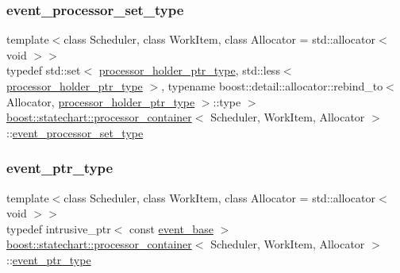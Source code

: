 \subsubsection{\texorpdfstring{event\+\_\+processor\+\_\+set\+\_\+type}{event\_processor\_set\_type}}
{\footnotesize\ttfamily template$<$class Scheduler, class Work\+Item, class Allocator = std\+::allocator$<$ void $>$$>$ \\
typedef std\+::set$<$ \mbox{\hyperlink{classboost_1_1statechart_1_1processor__container_a885e5a42694857bfaa44ec053ed20a57}{processor\+\_\+holder\+\_\+ptr\+\_\+type}}, std\+::less$<$ \mbox{\hyperlink{classboost_1_1statechart_1_1processor__container_a885e5a42694857bfaa44ec053ed20a57}{processor\+\_\+holder\+\_\+ptr\+\_\+type}} $>$, typename boost\+::detail\+::allocator\+::rebind\+\_\+to$<$ Allocator, \mbox{\hyperlink{classboost_1_1statechart_1_1processor__container_a885e5a42694857bfaa44ec053ed20a57}{processor\+\_\+holder\+\_\+ptr\+\_\+type}} $>$\+::type $>$ \mbox{\hyperlink{classboost_1_1statechart_1_1processor__container}{boost\+::statechart\+::processor\+\_\+container}}$<$ Scheduler, Work\+Item, Allocator $>$\+::\mbox{\hyperlink{classboost_1_1statechart_1_1processor__container_a34f8c87b6b4f8a8620c0bc6b124d0c77}{event\+\_\+processor\+\_\+set\+\_\+type}}\hspace{0.3cm}{\ttfamily [private]}}

\mbox{\label{classboost_1_1statechart_1_1processor__container_a0123b4f1061816fce5aa2c2ec4c06934}} 
\subsubsection{\texorpdfstring{event\+\_\+ptr\+\_\+type}{event\_ptr\_type}}
{\footnotesize\ttfamily template$<$class Scheduler, class Work\+Item, class Allocator = std\+::allocator$<$ void $>$$>$ \\
typedef intrusive\+\_\+ptr$<$ const \mbox{\hyperlink{classboost_1_1statechart_1_1event__base}{event\+\_\+base}} $>$ \mbox{\hyperlink{classboost_1_1statechart_1_1processor__container}{boost\+::statechart\+::processor\+\_\+container}}$<$ Scheduler, Work\+Item, Allocator $>$\+::\mbox{\hyperlink{classboost_1_1statechart_1_1processor__container_a0123b4f1061816fce5aa2c2ec4c06934}{event\+\_\+ptr\+\_\+type}}}

